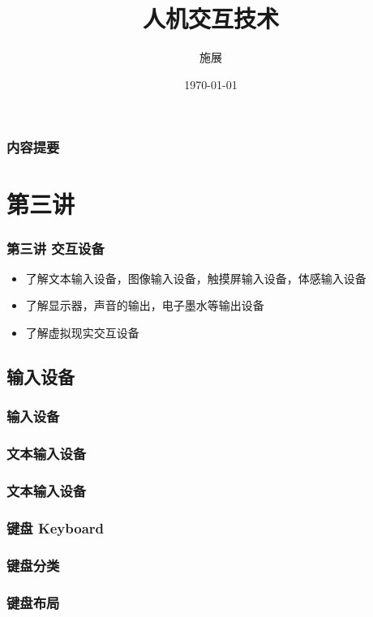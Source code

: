 \documentclass{beamer}
\title{人机交互技术}
\author{施展}
\institute{华中科技大学~武汉光电国家实验室}
\date{\today}
\begin{document}
\begin{frame}
	\titlepage
\end{frame}

\begin{frame}
	\frametitle{内容提要}
	\tableofcontents
\end{frame}

\section{第三讲}
\begin{frame}
	\frametitle{第三讲 交互设备}
	\begin{itemize}
		\item 了解文本输入设备，图像输入设备，触摸屏输入设备，体感输入设备
		\item 了解显示器，声音的输出，电子墨水等输出设备
		\item 了解虚拟现实交互设备
	\end{itemize}
\end{frame}

\subsection{输入设备}
\begin{frame}
	\frametitle{输入设备}

\end{frame}

\subsubsection{文本输入设备}
\begin{frame}
	\frametitle{文本输入设备}

\end{frame}

\begin{frame}
	\frametitle{键盘 Keyboard}

\end{frame}

\begin{frame}
	\frametitle{键盘分类}

\end{frame}

\begin{frame}
	\frametitle{键盘布局}

\end{frame}
\end{document}
